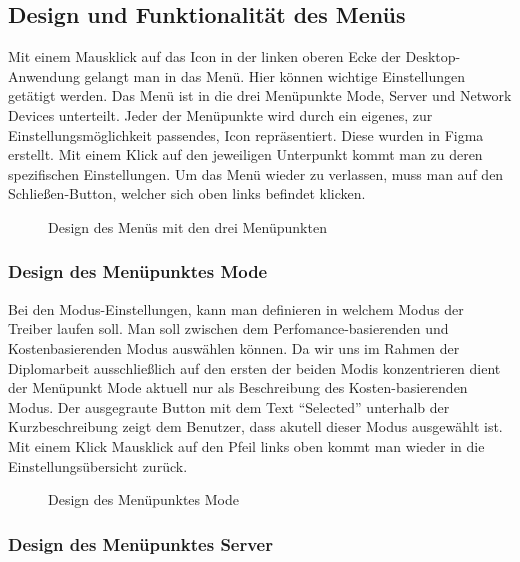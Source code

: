 \subsection{Design und Funktionalität des Menüs}
Mit einem Mausklick auf das Icon in der linken oberen Ecke der Desktop-Anwendung gelangt man in das Menü. Hier können wichtige Einstellungen getätigt werden. Das Menü ist in die drei Menüpunkte Mode, Server und Network Devices unterteilt. Jeder der Menüpunkte wird durch ein eigenes, zur Einstellungsmöglichkeit passendes, Icon repräsentiert. Diese wurden in Figma erstellt. Mit einem Klick auf den jeweiligen Unterpunkt kommt man zu deren spezifischen Einstellungen. Um das Menü wieder zu verlassen, muss man auf den Schließen-Button, welcher sich oben links befindet klicken.
\\
\begin{figure}[H]
    \centering
    \setlength{\fboxsep}{1pt}
	\setlength{\fboxrule}{1pt}
    \caption{Design des Menüs mit den drei Menüpunkten} 
\end{figure}

\pagebreak
\subsubsection{Design des Menüpunktes Mode}

Bei den Modus-Einstellungen, kann man definieren in welchem Modus der Treiber laufen soll. Man soll zwischen dem Perfomance-basierenden und Kostenbasierenden Modus auswählen können. Da wir uns im Rahmen der Diplomarbeit ausschließlich auf den ersten der beiden Modis konzentrieren dient der Menüpunkt Mode aktuell nur als Beschreibung des Kosten-basierenden Modus. Der ausgegraute Button mit dem Text “Selected” unterhalb der Kurzbeschreibung zeigt dem Benutzer, dass akutell dieser Modus ausgewählt ist. Mit einem Klick Mausklick auf den Pfeil links oben kommt man wieder in die Einstellungsübersicht zurück.
\\
\begin{figure}[H]
    \centering
    \setlength{\fboxsep}{1pt}
	\setlength{\fboxrule}{1pt}
    \caption{Design des Menüpunktes Mode} 
\end{figure}

\subsubsection{Design des Menüpunktes Server}

